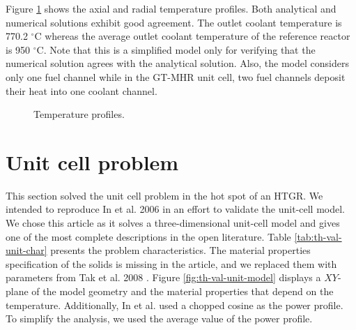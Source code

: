 Figure \ref{fig:th-ver-results} shows the axial and radial temperature profiles.
Both analytical and numerical solutions exhibit good agreement.
The outlet coolant temperature is 770.2 $^{\circ}$C whereas the average outlet coolant temperature of the reference reactor is 950 $^{\circ}$C.
Note that this is a simplified model only for verifying that the numerical solution agrees with the analytical solution.
Also, the model considers only one fuel channel while in the GT-MHR unit cell, two fuel channels deposit their heat into one coolant channel.

\begin{figure}[htbp!]
	\centering
	\hfill
    \caption{Temperature profiles.}
	\label{fig:th-ver-results}
\end{figure}

\section{Unit cell problem}

This section solved the unit cell problem in the hot spot of an HTGR.
We intended to reproduce In et al. 2006 \cite{in_three-dimensional_2006} in an effort to validate the unit-cell model.
We chose this article as it solves a three-dimensional unit-cell model and gives one of the most complete descriptions in the open literature.
Table \ref{tab:th-val-unit-char} presents the problem characteristics.
The material properties specification of the solids is missing in the article, and we replaced them with parameters from Tak et al. 2008 \cite{tak_numerical_2008}.
Figure \ref{fig:th-val-unit-model} displays a $XY$-plane of the model geometry and the material properties that depend on the temperature.
Additionally, In et al. used a chopped cosine as the power profile.
To simplify the analysis, we used the average value of the power profile.

